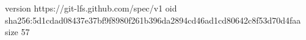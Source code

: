 version https://git-lfs.github.com/spec/v1
oid sha256:5d1cdad08437e37bf9f8980f261b396da2894cd46ad1cd80642c8f53d70d4faa
size 57
